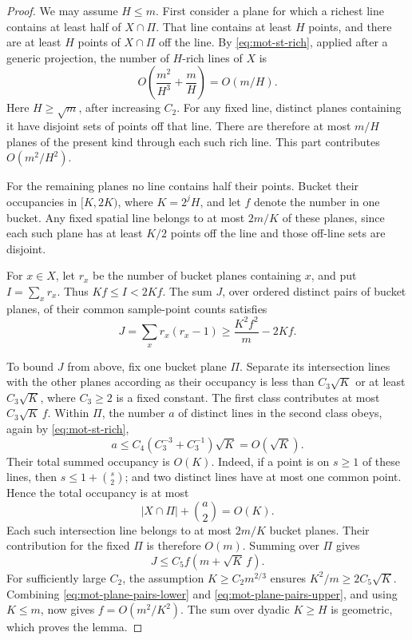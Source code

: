 \begin{proof}
We may assume $H\le m$.  First consider a plane for which a richest line contains at least half of $X\cap\Pi$. That line contains at least $H$ points, and there are at least $H$ points of $X\cap\Pi$ off the line.  By \eqref{eq:mot-st-rich}, applied after a generic projection, the number of $H$-rich lines of $X$ is
\[
 O\left(\frac{m^2}{H^3}+\frac mH\right)=O(m/H).
\]
Here $H\ge\sqrt m$, after increasing $C_2$. For any fixed line, distinct planes containing it have disjoint sets of points off that line.  There are therefore at most $m/H$ planes of the present kind through each such rich line. This part contributes $O(m^2/H^2)$.

For the remaining planes no line contains half their points. Bucket their occupancies in $[K,2K)$, where $K=2^jH$, and let $f$ denote the number in one bucket. Any fixed spatial line belongs to at most $2m/K$ of these planes, since each such plane has at least $K/2$ points off the line and those off-line sets are disjoint.

For $x\in X$, let $r_x$ be the number of bucket planes containing $x$, and put $I=\sum_xr_x$.  Thus $Kf\le I<2Kf$.  The sum $J$, over ordered distinct pairs of bucket planes, of their common sample-point counts satisfies
\begin{equation}
\label{eq:mot-plane-pairs-lower}
 J=\sum_xr_x(r_x-1)
 \ge \frac{K^2f^2}{m}-2Kf.
\end{equation}

To bound $J$ from above, fix one bucket plane $\Pi$. Separate its intersection lines with the other planes according as their occupancy is less than $C_3\sqrt K$ or at least $C_3\sqrt K$, where $C_3\ge2$ is a fixed constant. The first class contributes at most $C_3\sqrt K\,f$. Within $\Pi$, the number $a$ of distinct lines in the second class obeys, again by \eqref{eq:mot-st-rich},
\[
 a\le C_4\left(C_3^{-3}+C_3^{-1}\right)\sqrt K
 =O(\sqrt K).
\]
Their total summed occupancy is $O(K)$.  Indeed, if a point is on $s\ge1$ of these lines, then $s\le1+\binom{s}{2}$; and two distinct lines have at most one common point.  Hence the total occupancy is at most
\[
 |X\cap\Pi|+\binom a2=O(K).
\]
Each such intersection line belongs to at most $2m/K$ bucket planes.  Their contribution for the fixed $\Pi$ is therefore $O(m)$.  Summing over $\Pi$ gives
\begin{equation}
\label{eq:mot-plane-pairs-upper}
 J\le C_5 f(m+\sqrt K\,f).
\end{equation}
For sufficiently large $C_2$, the assumption $K\ge C_2m^{2/3}$ ensures $K^2/m\ge2C_5\sqrt K$.  Combining \eqref{eq:mot-plane-pairs-lower} and \eqref{eq:mot-plane-pairs-upper}, and using $K\le m$, now gives $f=O(m^2/K^2)$.  The sum over dyadic $K\ge H$ is geometric, which proves the lemma.
\end{proof}

